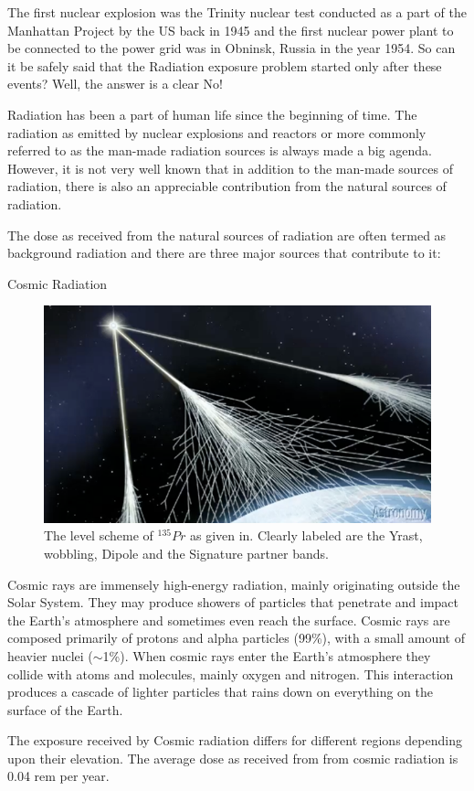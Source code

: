\documentclass[%
 amsmath,amssymb,
]{article}
\begin{document}
The first nuclear explosion was the Trinity nuclear test conducted as a part of the Manhattan Project by the US back in 1945 and the first nuclear power plant to be connected to the power grid was in Obninsk, Russia in the year 1954. So can it be safely said that the Radiation exposure problem started only after these events? Well, the answer is a clear No!

Radiation has been a part of human life since the beginning of time. The radiation as emitted by nuclear explosions and reactors or more commonly referred to as the man-made radiation sources is always made a big agenda. However, it is not very well known that in addition to the man-made sources of radiation, there is also an appreciable contribution from the natural sources of radiation. 

The dose as received from the natural sources of radiation are often termed as background radiation and there are three major sources that contribute to it:

\begin{section}{Cosmic Radiation}
\begin{figure}
\begin{center}
\includegraphics[width = \textwidth]{cosmic}
\caption{The level scheme of $^{135}Pr$ as given in. Clearly labeled are the Yrast, wobbling, Dipole and the Signature partner bands.}
\end{center}
\end{figure}

Cosmic rays are immensely high-energy radiation, mainly originating outside the Solar System. They may produce showers of particles that penetrate and impact the Earth’s atmosphere and sometimes even 
reach the surface. Cosmic rays are composed primarily of protons and alpha particles (99\%), with a small amount of heavier nuclei ($\sim$1\%). When cosmic rays enter the Earth’s atmosphere they collide with atoms and molecules, mainly oxygen and nitrogen. This interaction produces a cascade of lighter particles that rains down on everything on the surface of the Earth.

The exposure received by Cosmic radiation differs for different regions depending upon their elevation. The average dose as received from from cosmic radiation is 0.04 rem per year. 

\end{section}
\end{document}
